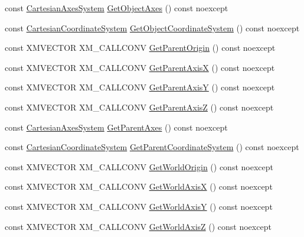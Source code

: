 \begin{DoxyCompactItemize}
\item 
const \hyperlink{structmage_1_1_cartesian_axes_system}{Cartesian\+Axes\+System} \hyperlink{classmage_1_1_transform_node_a3e6b79b7e1a0844d8f93acaecdf65346}{Get\+Object\+Axes} () const noexcept
\item 
const \hyperlink{structmage_1_1_cartesian_coordinate_system}{Cartesian\+Coordinate\+System} \hyperlink{classmage_1_1_transform_node_a59417bfb21810840f90cee6a192e6ffd}{Get\+Object\+Coordinate\+System} () const noexcept
\item 
const X\+M\+V\+E\+C\+T\+OR X\+M\+\_\+\+C\+A\+L\+L\+C\+O\+NV \hyperlink{classmage_1_1_transform_node_a8d440742d586070e38ba650d4744f149}{Get\+Parent\+Origin} () const noexcept
\item 
const X\+M\+V\+E\+C\+T\+OR X\+M\+\_\+\+C\+A\+L\+L\+C\+O\+NV \hyperlink{classmage_1_1_transform_node_ac48562fc57379dd710494307f0c8f6d0}{Get\+Parent\+AxisX} () const noexcept
\item 
const X\+M\+V\+E\+C\+T\+OR X\+M\+\_\+\+C\+A\+L\+L\+C\+O\+NV \hyperlink{classmage_1_1_transform_node_a992a00daf214e818cc2762b638ae9130}{Get\+Parent\+AxisY} () const noexcept
\item 
const X\+M\+V\+E\+C\+T\+OR X\+M\+\_\+\+C\+A\+L\+L\+C\+O\+NV \hyperlink{classmage_1_1_transform_node_a2683397fc2af734026baeab2125f0096}{Get\+Parent\+AxisZ} () const noexcept
\item 
const \hyperlink{structmage_1_1_cartesian_axes_system}{Cartesian\+Axes\+System} \hyperlink{classmage_1_1_transform_node_a65a2b2cef7a43dfce2e523f78d5eeb13}{Get\+Parent\+Axes} () const noexcept
\item 
const \hyperlink{structmage_1_1_cartesian_coordinate_system}{Cartesian\+Coordinate\+System} \hyperlink{classmage_1_1_transform_node_af99de109dd3e211fdc5f06a65ccc1e89}{Get\+Parent\+Coordinate\+System} () const noexcept
\item 
const X\+M\+V\+E\+C\+T\+OR X\+M\+\_\+\+C\+A\+L\+L\+C\+O\+NV \hyperlink{classmage_1_1_transform_node_a8c9f0abc146e7b7664218df44057a626}{Get\+World\+Origin} () const noexcept
\item 
const X\+M\+V\+E\+C\+T\+OR X\+M\+\_\+\+C\+A\+L\+L\+C\+O\+NV \hyperlink{classmage_1_1_transform_node_a590d0ea24f6d0a9a29f14feda4184750}{Get\+World\+AxisX} () const noexcept
\item 
const X\+M\+V\+E\+C\+T\+OR X\+M\+\_\+\+C\+A\+L\+L\+C\+O\+NV \hyperlink{classmage_1_1_transform_node_ad33e6a97ec9e1b484fcf87444c80c740}{Get\+World\+AxisY} () const noexcept
\item 
const X\+M\+V\+E\+C\+T\+OR X\+M\+\_\+\+C\+A\+L\+L\+C\+O\+NV \hyperlink{classmage_1_1_transform_node_ad34e88ffa2b2d3fd781c9645fd2af20c}{Get\+World\+AxisZ} () const noexcept

\end{DoxyCompactItemize}
